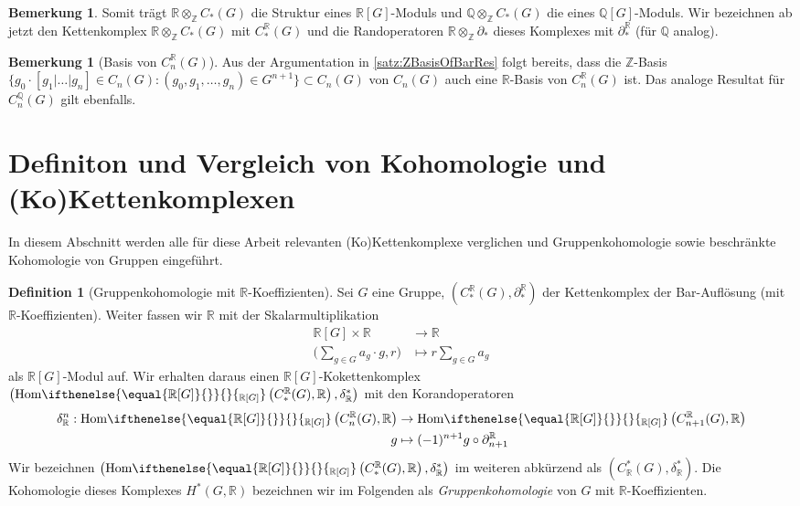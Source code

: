 \documentclass[a4paper,twoside,10pt]{scrreprt}
\newcommand{\Z}{\mathbb{Z}}
\newcommand{\Q}{\mathbb{Q}}
\newcommand{\R}{\mathbb{R}}
\newcommand{\Hom}[2][]{\text{Hom}%
\ifthenelse{\equal{#1}{}}{}{_{#1}}%
\left(#2\right)}%
\theoremstyle{definition}
\newtheorem{definition}[satz]{Definition}
\newtheorem{bemerkung}[satz]{Bemerkung}
\begin{document}
\begin{bemerkung} Somit trägt $\R\otimes_{\Z}C_*(G)$ die Struktur eines $\R[G]$-Moduls und $\Q\otimes_{\Z}C_*(G)$ die eines $\Q[G]$-Moduls. Wir bezeichnen ab jetzt den Kettenkomplex $\R\otimes_{\Z}C_*(G)$ mit $C^{\R}_*(G)$ und die Randoperatoren $\R\otimes_{\Z}\partial_*$ dieses Komplexes mit $\partial_*^{\R}$ (für $\Q$ analog).
\end{bemerkung}

\begin{bemerkung}[Basis von $C_n^{\R}(G)$]\label{bem:RBasisOfBarRes}
Aus der Argumentation in \cref{satz:ZBasisOfBarRes} folgt bereits, dass die $\Z$-Basis $\{g_0\cdot [g_1|\ldots|g_n]\in C_n(G):(g_0,g_1,\ldots,g_n)\in G^{n+1}\}\subset C_n(G)$ von $C_n(G)$ auch eine $\R$-Basis von $C_n^{\R}(G)$ ist. Das analoge Resultat für $C_n^{\Q}(G)$ gilt ebenfalls.
\end{bemerkung}

\section{Definiton und Vergleich von Kohomologie und (Ko)Kettenkomplexen}
In diesem Abschnitt werden alle für diese Arbeit relevanten (Ko)Kettenkomplexe verglichen und Gruppenkohomologie sowie beschränkte Kohomologie von Gruppen eingeführt.
\begin{definition}[Gruppenkohomologie mit $\R$-Koeffizienten]
Sei $G$ eine Gruppe, $\left(C_*^{\R}(G),\partial_*^{\R}\right)$ der Kettenkomplex der Bar-Auflösung (mit $\R$-Koeffizienten). 
Weiter fassen wir $\R$ mit der Skalarmultiplikation
\begin{align*}
\R[G]\times \R&\to \R\\
\biggl(\sum\limits_{g\in G}a_g\cdot g,r\biggr)&\mapsto r\sum\limits_{g\in G} a_g
\end{align*} 
als $\R[G]$-Modul auf.
Wir erhalten daraus einen $\R[G]$-Kokettenkomplex \\$\left(\Hom[\R{[}G{]}]{C_*^{\R}(G),\R},\delta_{\R}^*\right)$ mit den Korandoperatoren
\begin{align*}
\delta_{\R}^n:\Hom[\R{[}G{]}]{C_n^{\R}(G),\R}&\to \Hom[\R{[}G{]}]{C_{n+1}^{\R}(G),\R}\\
g&\mapsto (-1)^{n+1}g\circ \partial_{n+1}^{\R}
\end{align*}
Wir bezeichnen $\left(\Hom[\R{[}G{]}]{C_*^{\R}(G),\R},\delta_{\R}^*\right)$ im weiteren abkürzend als $\left(C_{\R}^*(G),\delta_{\R}^*\right)$. Die Kohomologie dieses Komplexes $H^*(G,\R)$ bezeichnen wir im Folgenden als \emph{Gruppenkohomologie} von $G$ mit $\R$-Koeffizienten.
\end{definition}
\end{document}
